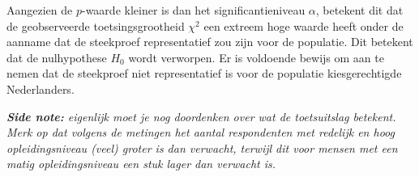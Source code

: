 {    Aangezien de $p$-waarde kleiner is dan het significantieniveau $\alpha$, betekent dit dat de geobserveerde toetsingsgrootheid $\chi^2$ een extreem hoge waarde heeft onder de aanname dat de steekproef representatief zou zijn voor de populatie.
    Dit betekent dat de nulhypothese $H_0$ wordt verworpen.
    Er is voldoende bewijs om aan te nemen dat de steekproef niet representatief is voor de populatie kiesgerechtigde Nederlanders.
    
    \begin{center}
    \end{center}

    \vspace{1em}

    {
        \itshape \textbf{Side note:} 
        eigenlijk moet je nog doordenken over wat de toetsuitslag betekent.
        Merk op dat volgens de metingen het aantal respondenten met redelijk en hoog opleidingsniveau (veel) groter is dan verwacht, terwijl dit voor mensen met een matig opleidingsniveau een stuk lager dan verwacht is.
    }
}
